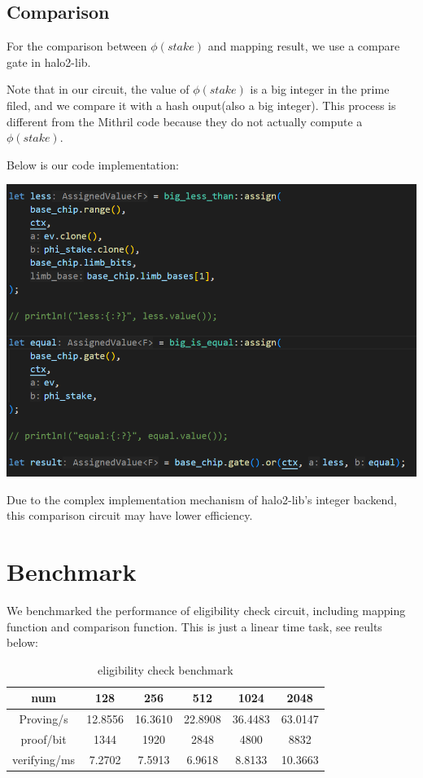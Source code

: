 \documentclass{article}
\begin{document}
\subsection{Comparison}

For the comparison between $\phi(stake)$ and mapping result, we use a compare gate in halo2-lib.

Note that in our circuit, the value of $\phi(stake)$ is a big integer in the prime filed, and we compare it with a hash ouput(also a big integer). This process is different from the Mithril code because they do not actually compute a $\phi(stake)$.

Below is our code implementation:


\includegraphics[width=1\linewidth]{compare_circuit_code.png}


Due to the complex implementation mechanism of halo2-lib's integer backend, this comparison circuit may have lower efficiency.


\section{Benchmark}

We benchmarked the performance of eligibility check circuit, including mapping function and comparison function. This is just a linear time task, see reults below:

\begin{table}[htbp]
    \centering
    \renewcommand{\arraystretch}{1.5} %
    \setlength{\tabcolsep}{10pt} %
    \begin{tabular}{cccccc} \toprule
        \textbf{num} & \textbf{128} & \textbf{256} & \textbf{512} & \textbf{1024} & \textbf{2048}  \\ \midrule
        Proving/s & 12.8556 & 16.3610 & 22.8908 & 36.4483 & 63.0147 \\ 
        proof/bit & 1344 & 1920 & 2848 & 4800 & 8832 \\ 
        verifying/ms & 7.2702 & 7.5913 & 6.9618 & 8.8133 & 10.3663 \\ \bottomrule
    \end{tabular}
    \caption{eligibility check benchmark}
    \label{tab:eligibility_check_benchmark}
\end{table}
\end{document}
